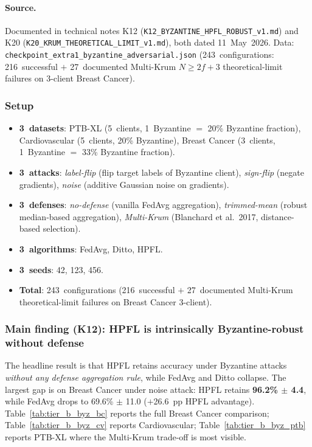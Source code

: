 \documentclass[conference]{IEEEtran}
\begin{document}
\paragraph{Source.} Documented in technical notes K12 (\texttt{K12\_BYZANTINE\_HPFL\_ROBUST\_v1.md}) and K20 (\texttt{K20\_KRUM\_THEORETICAL\_LIMIT\_v1.md}), both dated 11~May~2026. Data: \texttt{checkpoint\_extra1\_byzantine\_adversarial.json} (243~configurations: 216~successful $+$ 27~documented Multi-Krum $N{\geq}2f{+}3$ theoretical-limit failures on 3-client Breast Cancer).

\subsubsection*{Setup}

\begin{itemize}
\item \textbf{3~datasets}: PTB-XL (5~clients, 1~Byzantine $=$ 20\% Byzantine fraction), Cardiovascular (5~clients, 20\% Byzantine), Breast Cancer (3~clients, 1~Byzantine $=$ 33\% Byzantine fraction).
\item \textbf{3~attacks}: \emph{label-flip} (flip target labels of Byzantine client), \emph{sign-flip} (negate gradients), \emph{noise} (additive Gaussian noise on gradients).
\item \textbf{3~defenses}: \emph{no-defense} (vanilla FedAvg aggregation), \emph{trimmed-mean} (robust median-based aggregation), \emph{Multi-Krum} (Blanchard et al.~2017, distance-based selection).
\item \textbf{3~algorithms}: FedAvg, Ditto, HPFL.
\item \textbf{3~seeds}: 42, 123, 456.
\item \textbf{Total}: 243~configurations (216~successful $+$ 27~documented Multi-Krum theoretical-limit failures on Breast Cancer 3-client).
\end{itemize}

\subsubsection*{Main finding (K12): HPFL is intrinsically Byzantine-robust without defense}

The headline result is that HPFL retains accuracy under Byzantine attacks \emph{without any defense aggregation rule}, while FedAvg and Ditto collapse. The largest gap is on Breast Cancer under noise attack: HPFL retains \textbf{96.2\% $\pm$ 4.4}, while FedAvg drops to 69.6\% $\pm$ 11.0 ($+$26.6~pp HPFL advantage). Table~\ref{tab:tier_b_byz_bc} reports the full Breast Cancer comparison; Table~\ref{tab:tier_b_byz_cv} reports Cardiovascular; Table~\ref{tab:tier_b_byz_ptb} reports PTB-XL where the Multi-Krum trade-off is most visible.
\end{document}
